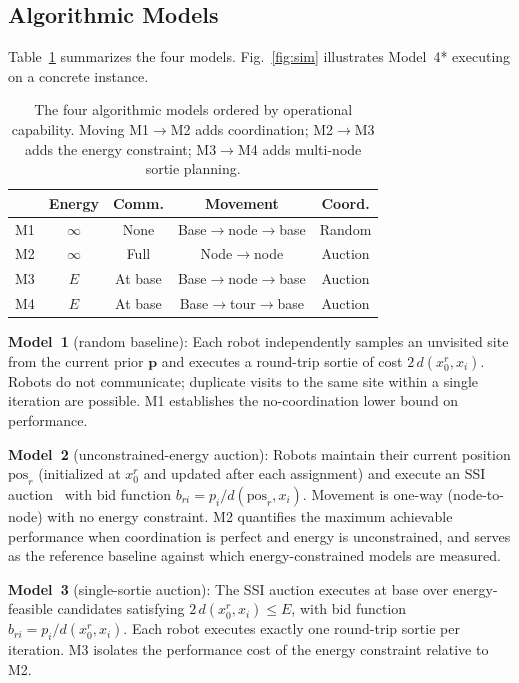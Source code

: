\documentclass[conference]{IEEEtran}
\begin{document}
\subsection{Algorithmic Models}\label{sec:algorithms}

Table~\ref{tab:models} summarizes the four models.
Fig.~\ref{fig:sim} illustrates Model~4* executing on a concrete instance.

\begin{table}[ht]
\centering
\caption{The four algorithmic models ordered by operational capability.
Moving M1$\to$M2 adds coordination; M2$\to$M3 adds the energy constraint;
M3$\to$M4 adds multi-node sortie planning.}\label{tab:models}
\vspace{2pt}
\begin{tabular}{@{}lcccc@{}}
\toprule
& \textbf{Energy} & \textbf{Comm.} & \textbf{Movement} & \textbf{Coord.} \\
\midrule
M1 & $\infty$ & None    & Base$\to$node$\to$base & Random  \\
M2 & $\infty$ & Full    & Node$\to$node           & Auction \\
M3 & $E$      & At base & Base$\to$node$\to$base  & Auction \\
M4 & $E$      & At base & Base$\to$tour$\to$base  & Auction \\
\bottomrule
\end{tabular}
\end{table}

\textbf{Model~1} (random baseline):
Each robot independently samples an unvisited site from the current prior
$\mathbf{p}$ and executes a round-trip sortie of cost $2\,d(x_0^r, x_i)$.
Robots do not communicate; duplicate visits to the same site within a single
iteration are possible.
M1 establishes the no-coordination lower bound on performance.

\textbf{Model~2} (unconstrained-energy auction):
Robots maintain their current position $\mathrm{pos}_r$ (initialized at
$x_0^r$ and updated after each assignment) and execute an SSI
auction~\cite{Koenig2006} with bid function $b_{ri} = p_i / d(\mathrm{pos}_r, x_i)$.
Movement is one-way (node-to-node) with no energy constraint.
M2 quantifies the maximum achievable performance when coordination is perfect
and energy is unconstrained, and serves as the reference baseline against
which energy-constrained models are measured.

\textbf{Model~3} (single-sortie auction):
The SSI auction executes at base over energy-feasible candidates satisfying
$2\,d(x_0^r, x_i) \leq E$, with bid function $b_{ri} = p_i/d(x_0^r, x_i)$.
Each robot executes exactly one round-trip sortie per iteration.
M3 isolates the performance cost of the energy constraint relative to M2.
\end{document}
